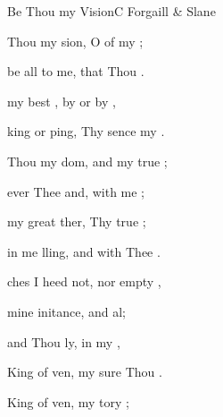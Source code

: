 \documentclass[12pt]{book}
\newcommand{\NotCCLIed}{\relax}
\begin{document}
\mainmatter
\ifWordBk
  \twocolumn
\fi

\begin{song}{Be Thou my Vision}{C}
    {\SBPubDom}
    {Forgaill \& Slane}
    {}
    {\NotCCLIed}


  \begin{SBVerse}
     Thou my sion, 
        O  of my ;

     be all  to me, 
         that Thou .

     my best , 
        by  or by ,

    king or ping, 
        Thy sence my .

    \Ch{[Interlude:}{}    \Ch{C]}{}
  \end{SBVerse}

  \begin{SBVerse}
     Thou my dom, 
        and  my true ;

     ever  Thee and, 
         with me ;

     my great ther, 
         Thy true ;

     in me lling, 
        and  with Thee .

    \Ch{[Interlude:}{}    \Ch{C]}{}
  \end{SBVerse}


  \begin{SBVerse}
    ches I heed  not, 
        nor  empty ,

     mine initance, 
         and al;

     and Thou ly, 
         in my ,

     King of ven, 
        my sure Thou .

    \Ch{[Interlude:}{}    \Ch{D]}{}
  \end{SBVerse}


  \begin{SBVerse}
     King of ven, 
        my tory ;


\end{SBVerse}
\end{song}
\end{document}
